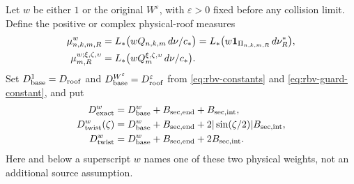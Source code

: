 Let $w$ be either $1$ or the original $W^\varepsilon$, with
$\varepsilon>0$ fixed before any collision limit. Define the
positive or complex physical-roof measures
\begin{align}
 \mu_{n,k,m,R}^{w}
      &=L_*\bigl(w Q_{n,k,m}\,d\nu/c_*\bigr)
        =L_*\bigl(w\mathbf1_{\Pi_{n,k,m,R}}\,d\nu_R^*\bigr),
                                                        \label{eq:rv-measures}\\
 \mu_{m,R}^{w;\xi,\zeta,\upsilon}
      &=L_*\bigl(w Q_m^{\xi,\zeta,\upsilon}\,d\nu/c_*\bigr).
                                                        \notag
\end{align}
Set $D_{\rm base}^{1}=D_{\rm roof}$ and
$D_{\rm base}^{W^\varepsilon}=D_{\rm roof}^\varepsilon$ from
\eqref{eq:rbv-constants} and \eqref{eq:rbv-guard-constant}, and put
\begin{align}
 D_{\rm exact}^{w}
    &=D_{\rm base}^{w}+B_{\rm sec,end}+B_{\rm sec,int},
                                                        \label{eq:rv-variation-constants}\\
 D_{\rm twist}^{w}(\zeta)
    &=D_{\rm base}^{w}+B_{\rm sec,end}
                          +2|\sin(\zeta/2)|B_{\rm sec,int},\notag\\
 D_{\rm twist}^{w}
    &=D_{\rm base}^{w}+B_{\rm sec,end}+2B_{\rm sec,int}.\notag
\end{align}
Here and below a superscript $w$ names one of these two physical
weights, not an additional source assumption.

